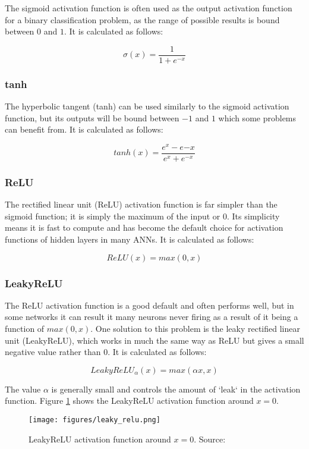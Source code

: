 \documentclass[
    author={Kai Hulme},
    supervisor={Dr Jon Bird},
    degree={BSc},
    title={Generative Adversarial Networks as an Augmentation Technique},
    subtitle={for Alzheimer's Disease Detection in MRI Volumes},
    type={Research},
    year={2021} 
]{dissertation}
\begin{document}
The sigmoid activation function is often used as the output activation function for a binary classification problem, as the range of possible results is bound between $0$ and $1$. It is calculated as follows:

\[ \sigma(x)=\frac{1}{1+e^{-x}} \]

\subsubsection{tanh}

The hyperbolic tangent (tanh) can be used similarly to the sigmoid activation function, but its outputs will be bound between $-1$ and $1$ which some problems can benefit from. It is calculated as follows:

\[ tanh(x)=\frac{e^x-e{-x}}{e^x+e^{-x}} \]

\subsubsection{ReLU}

The rectified linear unit (ReLU) activation function is far simpler than the sigmoid function; it is simply the maximum of the input or 0. Its simplicity means it is fast to compute and has become the default choice for activation functions of hidden layers in many ANNs. It is calculated as follows:

\[ ReLU(x)=max(0,x) \]

\subsubsection{LeakyReLU}

The ReLU activation function is a good default and often performs well, but in some networks it can result it many neurons never firing as a result of it being a function of $max(0,x)$. One solution to this problem is the leaky rectified linear unit (LeakyReLU), which works in much the same way as ReLU but gives a small negative value rather than 0. It is calculated as follows:

\[ LeakyReLU_\alpha(x)=max(\alpha x, x) \]

The value $\alpha$ is generally small and controls the amount of `leak` in the activation function. Figure \ref{leakyrelu} shows the LeakyReLU activation function around $x=0$.

\begin{figure}[t]
\centering
\texttt{[image: figures/leaky\_relu.png]}
\caption{LeakyReLU activation function around $x=0$. Source: \cite{geron2019hands}}
\label{leakyrelu}
\end{figure}
\end{document}
